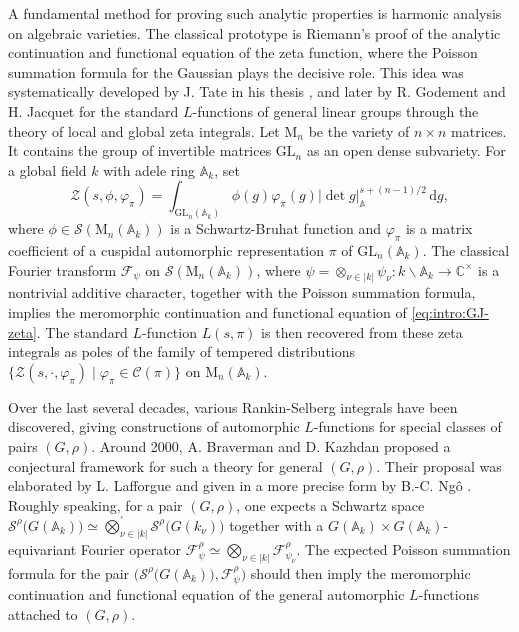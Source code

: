 \documentclass[iccmp]{ipbook}
\newcommand{\BA}{{\mathbb {A}}}
\newcommand{\BC}{{\mathbb {C}}}
\newcommand{\CC}{{\mathcal {C}}}
\newcommand{\CF}{{\mathcal {F}}}
\newcommand{\CS}{{\mathcal {S}}}
\newcommand{\CZ}{{\mathcal {Z}}}
\newcommand{\RM}{{\mathrm {M}}}
\newcommand{\GL}{{\mathrm{GL}}}
\newcommand{\ud}{\,\mathrm{d}}
\newcommand{\bs}{\backslash}
\def\vphi{\varphi}
\def\p{\prime}
\begin{document}
A fundamental method for proving such analytic properties is harmonic analysis on
algebraic varieties. The classical prototype is Riemann's proof of the analytic continuation
and functional equation of the zeta function, where the Poisson summation formula for the
Gaussian plays the decisive role. This idea was systematically developed by J. Tate in his
thesis \cite{tatethesis}, and later by R. Godement and H. Jacquet for the standard
$L$-functions of general linear groups \cite{gjzeta} through the theory of local and 
global zeta integrals. Let $\RM_n$ be the variety of $n\times n$ matrices. It contains the group of invertible matrices $\GL_n$ as an open dense subvariety. For a global field $k$ with
adele ring $\BA_k$, set
\begin{equation}\label{eq:intro:GJ-zeta}
\CZ(s,\phi,\vphi_\pi)=
\int_{\GL_n(\BA_k)}
\phi(g)\vphi_\pi(g)|\det g|_{\BA}^{s+(n-1)/2}\ud g,
\end{equation}
where $\phi\in \CS(\RM_n(\BA_k))$ is a Schwartz-Bruhat function and $\vphi_\pi$ is a
matrix coefficient of a cuspidal automorphic representation $\pi$ of $\GL_n(\BA_k)$.
The classical Fourier transform $\CF_\psi$ on $\CS(\RM_n(\BA_k))$, where 
$\psi = \otimes_{\nu\in |k|}\psi_\nu:k\bs \BA_k\to \BC^\times$ is a nontrivial additive character, together with the Poisson
summation formula, implies the meromorphic continuation
and functional equation of \eqref{eq:intro:GJ-zeta}. The standard $L$-function
$L(s,\pi)$ is then recovered from these zeta integrals as poles of 
the family of tempered distributions $\{\CZ(s,\cdot,\vphi_\pi)\mid \vphi_\pi\in \CC(\pi)\}$
on $\RM_n(\BA_k)$.

Over the last several decades, various Rankin-Selberg integrals have been discovered, giving constructions of automorphic $L$-functions for special classes of
pairs $(G,\rho)$. Around 2000, A. Braverman and D. Kazhdan proposed a conjectural framework for such a theory for general $(G,\rho)$. Their proposal was
elaborated by L. Lafforgue \cite{lafforgue2016principe} and given in a more precise form by B.-C. Ng\^o \cite{ngo2016hankel}.
Roughly speaking, for a pair $(G,\rho)$, one expects a Schwartz space $\CS^\rho\big(G(\BA_k)\big)\simeq \bigotimes^\p_{\nu\in |k|}\CS^\rho\big(G(k_\nu)\big)$ together
with a $G(\BA_k)\times G(\BA_k)$-equivariant Fourier operator $\CF^\rho_\psi\simeq \bigotimes_{\nu\in |k|}\CF^\rho_{\psi_\nu}$. The expected Poisson summation
formula for the pair $\big(\CS^\rho\big(G(\BA_k)\big),\CF^\rho_\psi\big)$ should then imply the meromorphic continuation and functional equation of the general
automorphic $L$-functions attached to $(G,\rho)$.
\end{document}
